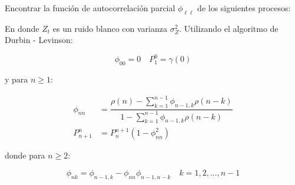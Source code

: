 
\addpoints
\question Encontrar la función de autocorrelación parcial $\phi_{\ell \ell}$ de los siguientes procesos:
\noaddpoints
{}
En donde $Z_t$ es un ruido blanco con varianza $\sigma_{Z}^{2}$. Utilizando el algoritmo de Durbin - Levinson:

$$\phi_{00}=0 \quad P_{1}^{0}=\gamma(0)$$

y para $n\geq 1$:

\begin{align*}
\phi_{nn}&=\dfrac{\rho(n)-\sum_{k=1}^{n-1}\phi_{n-1,k}\rho(n-k)}{1-\sum_{k=1}^{n-1}\phi_{n-1,k}\rho(n-k)}\\
P_{n+1}^{n}&= P_{n}^{n+1}(1-\phi_{nn}^2)
\end{align*}

donde para $n\geq 2$:

$$\phi_{nk}=\phi_{n-1,k}-\phi_{nn}\phi_{n-1,n-k}\quad k=1,2,\dots,n-1$$
